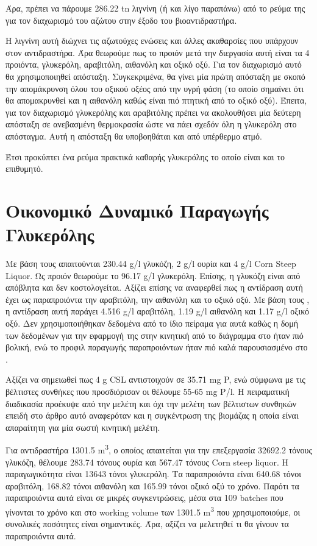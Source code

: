 \documentclass[11pt]{article}
\begin{document}
Άρα, πρέπει να πάρουμε 286.22 tn λιγνίνη (ή και λίγο παραπάνω) από το ρεύμα της για τον διαχωρισμό του αζώτου στην έξοδο του βιοαντιδραστήρα.

Η λιγνίνη αυτή διώχνει τις αζωτούχες ενώσεις και άλλες ακαθαρσίες που υπάρχουν στον αντιδραστήρα. Άρα θεωρούμε πως το προιόν μετά την διεργασία αυτή είναι τα 4 προιόντα, γλυκερόλη, αραβιτόλη, αιθανόλη και οξικό οξύ. Για τον διαχωρισμό αυτό θα χρησιμοποιηθεί απόσταξη. Συγκεκριμένα, θα γίνει μία πρώτη απόσταξη με σκοπό την απομάκρυνση όλου του οξικού οξέος από την υγρή φάση (το οποίο σημαίνει ότι θα απομακρυνθεί και η αιθανόλη καθώς είναι πιό πτητική από το οξικό οξύ). Έπειτα, για τον διαχωρισμό γλυκερόλης και αραβιτόλης πρέπει να ακολουθήσει μία δεύτερη απόσταξη σε ανεβασμένη θερμοκρασία ώστε να πάει σχεδόν όλη η γλυκερόλη στο απόσταγμα. Αυτή η απόσταξη θα υποβοηθάται και από υπέρθερμο ατμό.

Έτσι προκύπτει ένα ρεύμα πρακτικά καθαρής γλυκερόλης το οποίο είναι και το επιθυμητό.

\section{Οικονομικό Δυναμικό Παραγωγής Γλυκερόλης}
\label{sec:org4d2459d}
Με βάση τους \cite{jinByproductFormationNovel2003} απαιτούνται 230.44 g/l γλυκόζη, 2 g/l ουρία και 4 g/l Corn Steep Liquor. Ως προιόν θεωρούμε το 96.17 g/l γλυκερόλη. Επίσης, η γλυκόζη είναι από απόβλητα και δεν κοστολογείται. Αξίζει επίσης να αναφερθεί πως η αντίδραση αυτή έχει ως παραπροιόντα την αραβιτόλη, την αιθανόλη και το οξικό οξύ. Με βάση τους \cite{zhugeGlycerolProductionNovel2001}, η αντίδραση αυτή παράγει 4.516 g/l αραβιτόλη, 1.19 g/l αιθανόλη και 1.17 g/l οξικό οξύ. Δεν χρησιμοποιήθηκαν δεδομένα από το ίδιο πείραμα για αυτά καθώς η δομή των δεδομένων για την εφαρμογή της στην κινητική από το διάγραμμα στο \cite{jinByproductFormationNovel2003} ήταν πιό βολική, ενώ το προφιλ παραγωγής παραπροιόντων ήταν πιό καλά παρουσιασμένο στο \cite{zhugeGlycerolProductionNovel2001}.

Αξίζει να σημειωθεί πως 4 g CSL αντιστοιχούν σε 35.71 mg P, ενώ σύμφωνα με τις βέλτιστες συνθήκες που προσδιόρισαν οι \cite{zhugeGlycerolProductionNovel2001} θέλουμε 55-65 mg P/l. Η πειραματική διαδικασία προέκυψε από την μελέτη \cite{jinByproductFormationNovel2003} και όχι την μελέτη των βέλτιστων συνθηκών επειδή στο άρθρο αυτό αναφερόταν και η συγκέντρωση της βιομάζας η οποία είναι απαραίτητη για μία σωστή κινητική μελέτη.

Για αντιδραστήρα 1301.5 m\textsuperscript{3}, ο οποίος απαιτείται για την επεξεργασία 32692.2 τόνους γλυκόζη, θέλουμε 283.74 τόνους ουρία και 567.47 τόνους Corn steep liquor. Η παραγωγικότητα είναι 13643 τόνοι γλυκερόλη. Τα παραπροιόντα είναι 640.68 τόνοι αραβιτόλη, 168.82 τόνοι αιθανόλη και 165.99 τόνοι οξικό οξύ το χρόνο. Παρότι τα παραπροιόντα αυτά είναι σε μικρές συγκεντρώσεις, μέσα στα 109 batches που γίνονται το χρόνο και στο working volume των 1301.5 m\textsuperscript{3} που χρησιμοποιούμε, οι συνολικές ποσότητες είναι σημαντικές. Άρα, αξίζει να μελετηθεί τι θα γίνουν τα παραπροιόντα αυτά.
\end{document}

